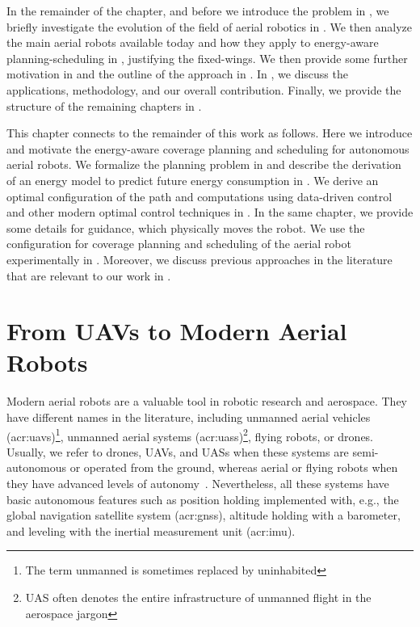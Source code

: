 In the remainder of the chapter, and before we introduce the problem in , we briefly investigate the evolution of the field of aerial robotics in . We then analyze the main aerial robots available today and how they apply to energy-aware planning-scheduling in , justifying the fixed-wings. We then provide some further motivation in  and the outline of the approach in . In , we discuss the applications, methodology, and our overall contribution. Finally, we provide the structure of the remaining chapters in .

This chapter connects to the remainder of this work as follows. Here we introduce and motivate the energy-aware coverage planning and scheduling for autonomous aerial robots. We formalize the planning problem in  and describe the derivation of an energy model to predict future energy consumption in . We derive an optimal configuration of the path and computations using data-driven control and other modern optimal control techniques in . In the same chapter, we provide some details for guidance, which physically moves the robot. We use the configuration for coverage planning and scheduling of the aerial robot experimentally in . Moreover, we discuss previous approaches in the literature that are relevant to our work in .


\section{From UAVs to Modern Aerial Robots}
\label{sec:history}

Modern aerial robots are a valuable tool in robotic research and aerospace. They have different names in the literature, including unmanned aerial vehicles (\Gls{acr:uav}s)\footnote{The term unmanned is sometimes replaced by uninhabited}, unmanned aerial systems (\Gls{acr:uas}s)\footnote{UAS often denotes the entire infrastructure of unmanned flight in the aerospace jargon}, flying robots, or drones. Usually, we refer to drones, UAVs, and UASs when these systems are semi-autonomous or operated from the ground, whereas aerial or flying robots when they have advanced levels of autonomy~\citep{siciliano2016springer}. Nevertheless, all these systems have basic autonomous features such as position holding implemented with, e.g., the global navigation satellite system (\Gls{acr:gnss}), altitude holding with a barometer, and leveling with the inertial measurement unit (\Gls{acr:imu}).

